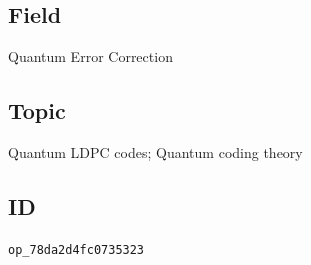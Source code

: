 \subsection*{Field}

Quantum Error Correction

\subsection*{Topic}

Quantum LDPC codes; Quantum coding theory

\subsection*{ID}

\texttt{op\_78da2d4fc0735323}
